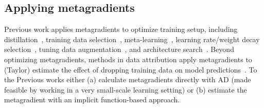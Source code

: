 \subsection{Applying metagradients}
Previous work applies metagradients to optimize training setup, including
distillation~\citep{maclaurin2015gradient,lorraine2020optimizing}, training data
selection~\citep{hara2019data,engstrom2024dsdm},
meta-learning~\citep{finn2017model,rajeswaran2019meta,hospedales2021meta},
learning rate/weight decay
selection~\citep{micaelli2021gradient,chandra2022gradient}, tuning data
augmentation~\citep{lorraine2020optimizing}, and architecture
search~\citep{maclaurin2015gradient,liu2018darts,zhang2021idarts}. Beyond
optimizing metagradients, methods in data attribution apply metagradients to
(Taylor) estimate the effect of dropping training data on model
predictions~\citep{koh2017understanding,grosse2023studying,park2023trak}. To the
Previous works either (a) calculate metagradients directly with AD (made
feasible by working in a very small-scale learning setting) or (b) estimate the
metagradient with an implicit function-based approach.


